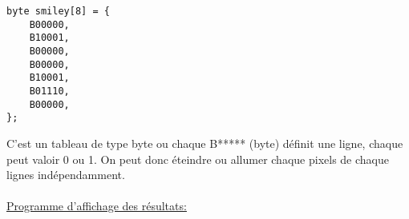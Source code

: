   \begin{lstlisting}
byte smiley[8] = {
    B00000,
    B10001,
    B00000,
    B00000,
    B10001,
    B01110,
    B00000,
};
  \end{lstlisting}
  
  
  C'est un tableau de type byte ou chaque \og B***** \fg (byte) définit une ligne, chaque \og * \fg peut valoir 0 ou 1. 
  On peut donc éteindre ou allumer chaque pixels de chaque lignes indépendamment.
  
\paragraph{}
\underline{Programme d'affichage des résultats:}

    
